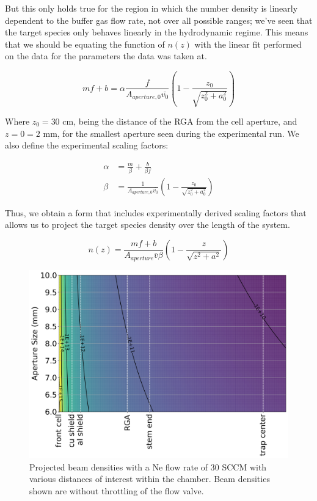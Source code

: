 But this only holds true for the region in which the number density is linearly dependent to the buffer gas flow rate, not over all possible ranges; we've seen that the target species only behaves linearly in the hydrodynamic regime. This means that we should be equating the function of $n(z)$ with the linear fit performed on the data for the parameters the data was taken at.

\begin{equation*}
	mf+b = \alpha\frac{f}{A_{aperture, 0} \bar{v_0}}\left(1-\frac{z_0}{\sqrt{z_0^2+a_0^2}}\right) 
\end{equation*}

Where $z_0=30$ cm, being the distance of the RGA from the cell aperture, and $z=0=2$ mm, for the smallest aperture seen during the experimental run. We also define the experimental scaling factors:

\begin{align*}
	\alpha & = \frac{m}{\beta}+\frac{b}{\beta f} \\
	\beta & = \frac{1}{A_{aperture, 0} \bar{v_0}}\left(1-\frac{z_0}{\sqrt{z_0^2+a_0^2}}\right)
\end{align*}

Thus, we obtain a form that includes experimentally derived scaling factors that allows us to project the target species density over the length of the system.

\begin{equation}
	n(z) = \frac{mf+b}{A_{aperture} \bar{v} \beta}\left(1-\frac{z}{\sqrt{z^2+a^2}}\right)
	\label{eq: experimental n(z)}
\end{equation}

\begin{figure}[H]
	\centering
	\includegraphics[width=1\textwidth]{images/CBGB_beam_density_over_system.png}
	\caption{Projected beam densities with a Ne flow rate of 30 SCCM with various distances of interest within the chamber. Beam densities shown are without throttling of the  flow valve.}
	\label{fig: beam_density}
\end{figure}

